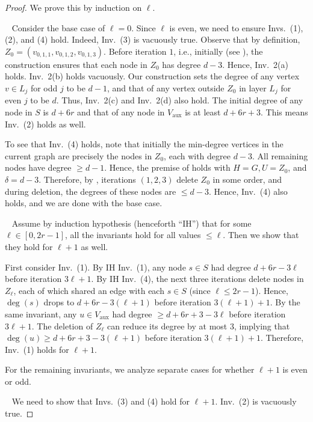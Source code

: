 \documentclass[11pt,letterpaper]{article}
\renewcommand{\geq}{\geqslant}
\renewcommand{\leq}{\leqslant}
\theoremstyle{definition}
\newcommand{\Vaux}{V_{\text{aux}}}
\newcommand{\mypar}[1]{\smallskip\noindent{\sffamily\bfseries #1.}~}
\begin{document}
\begin{proof}
  We prove this by induction on $\ell$. 
  
  \mypar{Base case} Consider the base case of $\ell=0$. Since $\ell$ is even, we need to ensure Invs.~(1), (2), and (4) hold. Indeed, Inv.~(3) is vacuously true. Observe that by definition, $Z_0=(v_{0,1,1}, v_{0,1,2},v_{0,1,3})$. Before iteration $1$, i.e., initially (see ), the construction ensures that each node in $Z_0$ has degree $d-3$. Hence, Inv.~2(a) holds. Inv.~2(b) holds vacuously. Our construction sets the degree of any vertex $v\in L_j$ for odd $j$ to be $d-1$, and that of any vertex outside $Z_0$ in layer $L_j$ for even $j$ to be $d$. Thus, Inv.~2(c) and Inv.~2(d) also hold. The initial degree of any node in $S$ is $d+6r$ and that of any node in $\Vaux$ is at least $d+6r+3$. This means Inv.~(2) holds as well.

  To see that Inv.~(4) holds, note that initially the min-degree vertices in the current graph are precisely the nodes in $Z_{0}$, each with degree $d-3$. All remaining nodes have degree $\geq d-1$. Hence, the premise of  holds with $H=G, U=Z_0$, and $\delta=d-3$. Therefore, by , iterations $(1,2,3)$ delete $Z_0$ in some order, and during deletion, the degrees of these nodes are $\leq d-3$. Hence, Inv.~(4) also holds, and we are done with the base case.    

 
\mypar{Inductive Step} Assume by induction hypothesis (henceforth ``IH'') that for some $\ell\in [0,2r-1]$, all the invariants hold for all values $\leq \ell$. Then we show that they hold for $\ell+1$ as well. 

First consider Inv.~(1). By IH Inv.~(1), any node $s\in S$ had degree $d+6r-3\ell$ before iteration $3\ell+1$. By IH Inv.~(4), the next three iterations delete nodes in $Z_\ell$, each of which shared an edge with each $s\in S$ (since $\ell\leq 2r-1$). Hence, $\deg(s)$ drops to $d+6r-3(\ell+1)$ before iteration $3(\ell+1)+1$. By the same invariant, any $u\in \Vaux$ had degree $\geq d+6r+3-3\ell$ before iteration $3\ell+1$. The deletion of $Z_\ell$ can reduce its degree by at most $3$, implying that $\deg(u)\geq d+6r+3-3(\ell+1)$ before iteration $3(\ell+1)+1$. Therefore, Inv.~(1) holds for $\ell+1$. 

For the remaining invariants, we analyze separate cases for whether $\ell+1$ is even or odd.  

\mypar{Case 1: $\ell+1$ is odd} We need to show that Invs.~(3) and (4) hold for $\ell+1$. Inv.~(2) is vacuously true. 


\end{proof}
\end{document}
